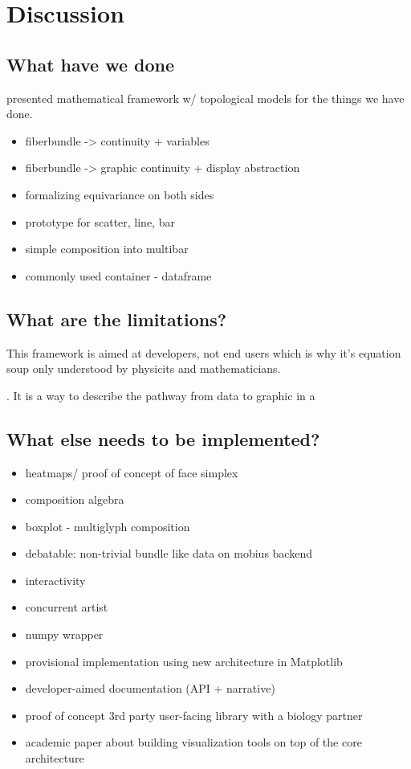 \documentclass[../main.tex]{subfiles}
\begin{document}
\section{Discussion}

\subsection{What have we done}
presented mathematical framework w/ topological models for the things we have done. 
 \begin{itemize}
    \item fiberbundle -> continuity + variables
    \item fiberbundle -> graphic continuity + display abstraction
    \item formalizing equivariance on both sides 
    \item prototype for scatter, line, bar
    \item simple composition into multibar
    \item commonly used container - dataframe
 \end{itemize}

\subsection{What are the limitations?}
This framework is aimed at developers, not end users which is why it's equation soup only understood by physicits and mathematicians.  

.  It is a way to describe the pathway from data to graphic in a 

\subsection{What else needs to be implemented?}
\begin{itemize}
    \item heatmaps/ proof of concept of face simplex
    \item composition algebra
    \item boxplot - multiglyph composition
    \item debatable: non-trivial bundle like data on mobius backend
    \item interactivity 
    \item concurrent artist
    \item numpy wrapper
\end{itemize}
\begin{itemize}
    \item provisional implementation using new architecture in Matplotlib
    \item developer-aimed documentation (API + narrative)
    \item proof of concept 3rd party user-facing library with a biology partner
    \item academic paper about building visualization tools on top of the core architecture
\end{itemize}
\end{document}
